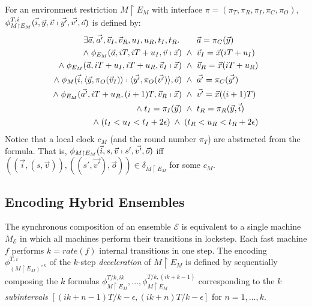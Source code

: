 \begin{definition}
For an environment restriction $M \restriction E_M$
with  interface %
$\pi=(\pi_T, \pi_R, \pi_I, \pi_C, \pi_O)$,
$\phi_{M \restriction E_M}^{T,i}(\vec{i}, \vec{y}, \vec{v} \shortmid \vec{y'}, \vec{v'}, \vec{o})$
is defined %
by:
\begin{align*}
\begin{alignedat}{3}
\exists \vec{a},\vec{a'}, \vec{v}_I, \vec{v}_R, u_I, u_R, t_I, t_R.\;
&&&
\vec{a} = \pi_C(\vec{y})
\\
\wedge\;
\phi_{E_M}(\vec{a},iT,iT+u_I,\vec{v} \shortmid \vec{x})
&\;\;\wedge\;\;&&
\vec{v}_I = \vec{x}(iT+u_I)
\\
\wedge\;
\phi_{E_M}(\vec{a},iT+u_I,iT+u_R,\vec{v}_I \shortmid \vec{x})
&\;\;\wedge\;\;&&
\vec{v}_R = \vec{x}(iT+u_R)
\\
\wedge\;
\phi_M(\vec{i},\langle\vec{y},\pi_O(\vec{v}_I)\rangle \shortmid \langle\vec{y'},\pi_O(\vec{v'})\rangle, \vec{o})
&\;\;\wedge\;\;&&
\vec{a'} = \pi_C(\vec{y'})
\\
\wedge\;
\phi_{E_M}(\vec{a'},iT+u_R, (i+1)T ,\vec{v}_R \shortmid \vec{x})
&\;\;\wedge\;\;&&
\vec{v'} = \vec{x}((i+1)T)
\\
\wedge\;
t_I = \pi_I(\vec{y})
&\;\;\wedge\;\;&&
t_R = \pi_R(\vec{y},\vec{i})
\end{alignedat}
\\
\begin{alignedat}{3}
\wedge\;
(t_I < u_I < t_I + 2\epsilon)
\;\wedge\;
(t_R < u_R < t_R + 2\epsilon)
\end{alignedat}
\end{align*}
%
Notice that a local clock $c_M$ (and the round number $\pi_T$)
are abstracted from the formula.
That is,
$\phi_{M \restriction E_M}(\vec{i}, s, \vec{v} \shortmid s', \vec{v'}, \vec{o})$
iff
$( (\vec{i}, (s,\vec{v})), ((s',\vec{v'}), \vec{o}) ) \in \delta_{M \restriction E_M}$
for some $c_M$.
\end{definition}




\subsection{Encoding Hybrid Ensembles}

The synchronous composition  of an ensemble 
$\mathcal{E}$ is equivalent to a single machine $M_\mathcal{E}$
in which all machines perform their transitions in lockstep.
Each fast machine $f$  performs $k = \mathit{rate}(f)$  internal transitions in one step.
%
The encoding
$\phi_{(M \restriction E_M)^{\times k}}^{T, i}$
of the $k$-step \emph{deceleration} of %
$M \restriction E_M$
is defined by sequentially 
composing the 
$k$ formulas $\phi_{M \restriction E_M}^{T/k,ik},\ldots,\phi_{M \restriction E_M}^{T/k,(ik+k-1)}$
corresponding  to the $k$  \emph{subintervals} $[(ik+n-1)T/k-\epsilon,(ik+n)T/k-\epsilon]$ 
for $n=1,\ldots,k$.


